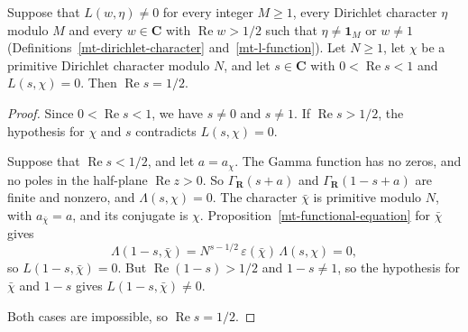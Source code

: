 \begin{proposition}\label{mt-strip-primitive-of-half-plane}
Suppose that $L(w,\eta)\neq0$ for every integer $M\geq1$, every Dirichlet character $\eta$ modulo
$M$ and every $w\in\mathbf C$ with $\operatorname{Re}w>1/2$ such that $\eta\neq\mathbf 1_M$ or
$w\neq1$ (Definitions~\ref{mt-dirichlet-character} and~\ref{mt-l-function}). Let $N\geq1$, let
$\chi$ be a primitive Dirichlet character modulo $N$, and let $s\in\mathbf C$ with
$0<\operatorname{Re}s<1$ and $L(s,\chi)=0$. Then $\operatorname{Re}s=1/2$.
\end{proposition}
\begin{proof}
Since $0<\operatorname{Re}s<1$, we have $s\neq0$ and $s\neq1$. If $\operatorname{Re}s>1/2$, the
hypothesis for $\chi$ and $s$ contradicts $L(s,\chi)=0$.

Suppose that $\operatorname{Re}s<1/2$, and let $a=a_\chi$. The Gamma function has no zeros, and no
poles in the half-plane $\operatorname{Re}z>0$. So $\Gamma_{\mathbf R}(s+a)$ and
$\Gamma_{\mathbf R}(1-s+a)$ are finite and nonzero, and $\Lambda(s,\chi)=0$. The character
$\bar\chi$ is primitive modulo $N$, with $a_{\bar\chi}=a$, and its conjugate is $\chi$.
Proposition~\ref{mt-functional-equation} for $\bar\chi$ gives
\[
 \Lambda(1-s,\bar\chi)=N^{s-1/2}\,\varepsilon(\bar\chi)\,\Lambda(s,\chi)=0,
\]
so $L(1-s,\bar\chi)=0$. But $\operatorname{Re}(1-s)>1/2$ and $1-s\neq1$, so the hypothesis for
$\bar\chi$ and $1-s$ gives $L(1-s,\bar\chi)\neq0$.

Both cases are impossible, so $\operatorname{Re}s=1/2$.
\end{proof}

